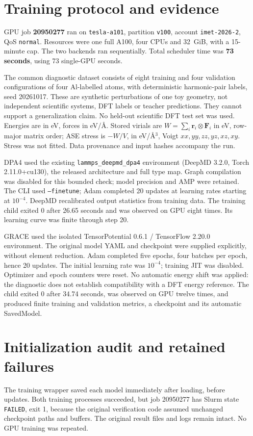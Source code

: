 \documentclass[10pt,a4paper]{article}
\begin{document}
\section{Training protocol and evidence}
GPU job \textbf{20950277} ran on \texttt{tesla-a101}, partition \texttt{v100},
account \texttt{imet-2026-2}, QoS \texttt{normal}. Resources were one full A100,
four CPUs and 32~GiB, with a 15-minute cap. The two backends ran sequentially.
Total scheduler time was \textbf{73 seconds}, using 73 single-GPU seconds.

The common diagnostic dataset consists of eight training and four validation
configurations of four Al-labelled atoms, with deterministic harmonic-pair
labels, seed 20261017. These are synthetic perturbations of one toy geometry,
not independent scientific systems, DFT labels or teacher predictions. They
cannot support a generalization claim. No held-out scientific DFT test set was
used. Energies are in eV, forces in eV/\AA. Stored virials are
$W=\sum_i\mathbf r_i\otimes\mathbf F_i$ in eV, row-major matrix order;
ASE stress is $-W/V$, in eV/\AA$^3$, Voigt $xx,yy,zz,yz,xz,xy$.
Stress was not fitted. Data provenance and input hashes accompany the run.

DPA4 used the existing \texttt{lammps\_deepmd\_dpa4} environment (DeepMD 3.2.0,
Torch 2.11.0+cu130), the released architecture and full type map. Graph compilation
was disabled for this bounded check; model precision and AMP were retained.
The CLI used \texttt{--finetune}; Adam completed 20 updates at learning rates
starting at $10^{-4}$. DeepMD recalibrated output statistics from training data.
The training child exited 0 after 26.65 seconds and was observed on GPU eight
times. Its learning curve was finite through step 20.

GRACE used the isolated TensorPotential 0.6.1 / TensorFlow 2.20.0 environment.
The original model YAML and checkpoint were supplied explicitly, without element
reduction. Adam completed five epochs, four batches per epoch, hence 20 updates.
The initial learning rate was $10^{-4}$; training JIT was disabled. Optimizer and
epoch counters were reset. No automatic energy shift was applied: the diagnostic
does not establish compatibility with a DFT energy reference. The child exited 0
after 34.74 seconds, was observed on GPU twelve times, and produced finite
training and validation metrics, a checkpoint and its automatic SavedModel.

\section{Initialization audit and retained failures}
The training wrapper saved each model immediately after loading, before updates.
Both training processes succeeded, but job 20950277 has Slurm state
\texttt{FAILED}, exit 1, because the original verification code assumed unchanged
checkpoint paths and buffers. The original result files and logs remain intact.
No GPU training was repeated.
\end{document}
